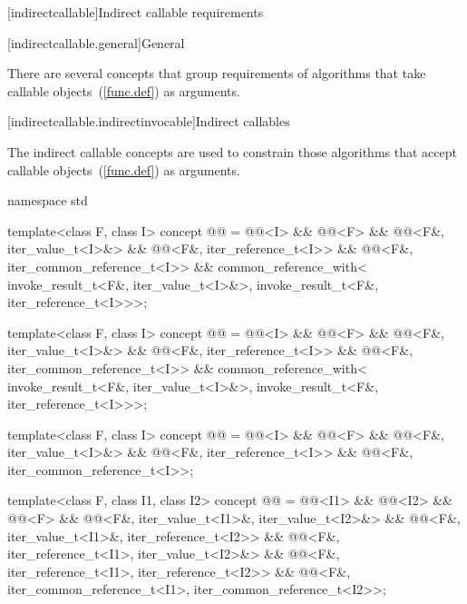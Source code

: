 [indirectcallable]{Indirect callable requirements}

[indirectcallable.general]{General}

\pnum
There are several concepts that group requirements of algorithms that
take callable objects~(\ref{func.def}) as arguments.

[indirectcallable.indirectinvocable]{Indirect callables}

\pnum
The indirect callable concepts are used to constrain those algorithms
that accept callable objects~(\ref{func.def}) as arguments.

\begin{codeblock}
namespace std {
  template<class F, class I>
    concept @@ =
      @@<I> &&
      @@<F> &&
      @@<F&, iter_value_t<I>&> &&
      @@<F&, iter_reference_t<I>> &&
      @@<F&, iter_common_reference_t<I>> &&
      common_reference_with<
        invoke_result_t<F&, iter_value_t<I>&>,
        invoke_result_t<F&, iter_reference_t<I>>>;

  template<class F, class I>
    concept @@ =
      @@<I> &&
      @@<F> &&
      @@<F&, iter_value_t<I>&> &&
      @@<F&, iter_reference_t<I>> &&
      @@<F&, iter_common_reference_t<I>> &&
      common_reference_with<
        invoke_result_t<F&, iter_value_t<I>&>,
        invoke_result_t<F&, iter_reference_t<I>>>;

  template<class F, class I>
    concept @@ =
      @@<I> &&
      @@<F> &&
      @@<F&, iter_value_t<I>&> &&
      @@<F&, iter_reference_t<I>> &&
      @@<F&, iter_common_reference_t<I>>;

  template<class F, class I1, class I2>
    concept @@ =
      @@<I1> && @@<I2> &&
      @@<F> &&
      @@<F&, iter_value_t<I1>&, iter_value_t<I2>&> &&
      @@<F&, iter_value_t<I1>&, iter_reference_t<I2>> &&
      @@<F&, iter_reference_t<I1>, iter_value_t<I2>&> &&
      @@<F&, iter_reference_t<I1>, iter_reference_t<I2>> &&
      @@<F&, iter_common_reference_t<I1>, iter_common_reference_t<I2>>;

}
\end{codeblock}
